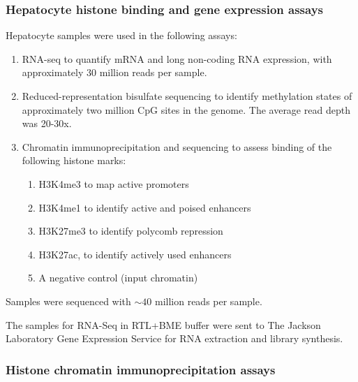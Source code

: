 \documentclass[
  11pt,
]{article}
\providecommand{\tightlist}{%
  \setlength{\itemsep}{0pt}\setlength{\parskip}{0pt}}
\begin{document}
\hypertarget{hepatocyte-histone-binding-and-gene-expression-assays}{%
\subsubsection{Hepatocyte histone binding and gene expression
assays}\label{hepatocyte-histone-binding-and-gene-expression-assays}}

Hepatocyte samples were used in the following assays:

\begin{enumerate}
\def\labelenumi{\arabic{enumi}.}
\tightlist
\item
  RNA-seq to quantify mRNA and long non-coding RNA expression, with
  approximately 30 million reads per sample.
\item
  Reduced-representation bisulfate sequencing to identify methylation
  states of approximately two million CpG sites in the genome. The
  average read depth was 20-30x.
\item
  Chromatin immunoprecipitation and sequencing to assess binding of the
  following histone marks:

  \begin{enumerate}
  \def\labelenumii{\alph{enumii}.}
  \tightlist
  \item
    H3K4me3 to map active promoters
  \item
    H3K4me1 to identify active and poised enhancers
  \item
    H3K27me3 to identify polycomb repression
  \item
    H3K27ac, to identify actively used enhancers
  \item
    A negative control (input chromatin)
  \end{enumerate}
\end{enumerate}

Samples were sequenced with \(\sim40\) million reads per sample.

The samples for RNA-Seq in RTL+BME buffer were sent to The Jackson
Laboratory Gene Expression Service for RNA extraction and library
synthesis.

\hypertarget{histone-chromatin-immunoprecipitation-assays}{%
\subsubsection{Histone chromatin immunoprecipitation
assays}\label{histone-chromatin-immunoprecipitation-assays}}
\end{document}
